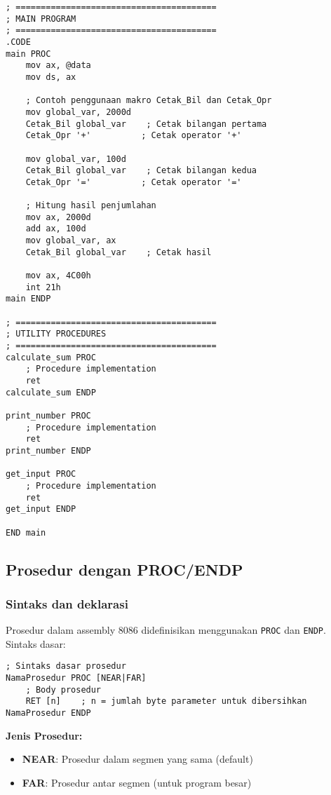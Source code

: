 \documentclass[../main.tex]{subfiles}
\begin{document}
\begin{lstlisting}[language={[x86masm]Assembler}, caption=Struktur Program Modular, label={lst:modular-structure}]
; ========================================
; MAIN PROGRAM
; ========================================
.CODE
main PROC
    mov ax, @data
    mov ds, ax
    
    ; Contoh penggunaan makro Cetak_Bil dan Cetak_Opr
    mov global_var, 2000d
    Cetak_Bil global_var    ; Cetak bilangan pertama
    Cetak_Opr '+'          ; Cetak operator '+'
    
    mov global_var, 100d
    Cetak_Bil global_var    ; Cetak bilangan kedua
    Cetak_Opr '='          ; Cetak operator '='
    
    ; Hitung hasil penjumlahan
    mov ax, 2000d
    add ax, 100d
    mov global_var, ax
    Cetak_Bil global_var    ; Cetak hasil
    
    mov ax, 4C00h
    int 21h
main ENDP

; ========================================
; UTILITY PROCEDURES
; ========================================
calculate_sum PROC
    ; Procedure implementation
    ret
calculate_sum ENDP

print_number PROC
    ; Procedure implementation
    ret
print_number ENDP

get_input PROC
    ; Procedure implementation
    ret
get_input ENDP

END main
            \end{lstlisting}

        \subsection{Prosedur dengan PROC/ENDP}
            \subsubsection{Sintaks dan deklarasi}
                Prosedur dalam assembly 8086 didefinisikan menggunakan \texttt{PROC} dan \texttt{ENDP}. Sintaks dasar:

                \begin{lstlisting}[language={[x86masm]Assembler}, caption=Sintaks Prosedur Dasar, label={lst:procedure-syntax}]
; Sintaks dasar prosedur
NamaProsedur PROC [NEAR|FAR]
    ; Body prosedur
    RET [n]    ; n = jumlah byte parameter untuk dibersihkan
NamaProsedur ENDP
                \end{lstlisting}

                \textbf{Jenis Prosedur:}
                \begin{itemize}
                    \item \textbf{NEAR}: Prosedur dalam segmen yang sama (default)
                    \item \textbf{FAR}: Prosedur antar segmen (untuk program besar)
                \end{itemize}
\end{document}
